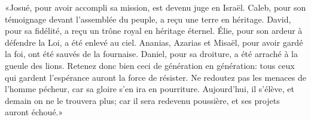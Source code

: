 «Josué, pour avoir accompli sa mission, est devenu juge en Israël.
Caleb, pour son témoignage devant l’assemblée du peuple, a reçu une terre en héritage.
David, pour sa fidélité, a reçu un trône royal en héritage éternel.
	Élie, pour son ardeur à défendre la Loi, a été enlevé au ciel.
Ananias, Azarias et Misaël, pour avoir gardé la foi, ont été sauvés de la fournaise.
	Daniel, pour sa droiture, a été arraché à la gueule des lions.
Retenez donc bien ceci de génération en génération:
	tous ceux qui gardent l’espérance auront la force de résister.
Ne redoutez pas les menaces de l’homme pécheur, car sa gloire s’en ira en pourriture.
Aujourd’hui, il s’élève, et demain on ne le trouvera plus;
	car il sera redevenu poussière, et ses projets auront échoué.»
